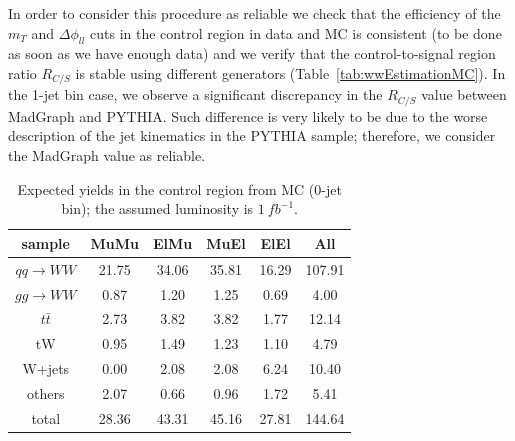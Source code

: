 In order to consider this procedure as reliable we check that the efficiency of the $m_T$ and $\Delta\phi_{ll}$ 
cuts in the control region in data and MC is consistent (to be done as soon as we have enough data) and we verify that the control-to-signal 
region ratio $R_{C/S}$ is stable using different generators (Table~\ref{tab:wwEstimationMC}). 
In the 1-jet bin case, we observe a significant discrepancy in the $R_{C/S}$ value between MadGraph and PYTHIA.
Such difference is very likely to be due to the worse description of the jet kinematics in the PYTHIA sample;
therefore, we consider the MadGraph value as reliable.

\begin{table}[!htbp]
\begin{center}
\begin{tabular}{|c|c|c|c|c|c|} \hline
 sample               &       MuMu &       ElMu &       MuEl &       ElEl &        All \\ \hline\hline
   $qq\rightarrow WW$ &      21.75 &      34.06 &      35.81 &      16.29 &     107.91 \\ 
   $gg\rightarrow WW$ &       0.87 &       1.20 &       1.25 &       0.69 &       4.00 \\ 
  $t\bar t$           &       2.73 &       3.82 &       3.82 &       1.77 &      12.14 \\ 
     tW               &       0.95 &       1.49 &       1.23 &       1.10 &       4.79 \\ 
 W+jets               &       0.00 &       2.08 &       2.08 &       6.24 &      10.40 \\ 
 others               &       2.07 &       0.66 &       0.96 &       1.72 &       5.41 \\ \hline
  total               &      28.36 &      43.31 &      45.16 &      27.81 &     144.64 \\ \hline
\end{tabular}
\caption{Expected yields in the control region from MC (0-jet bin); the assumed luminosity is $1~fb^{-1}$.}
\label{tab:wwEstimationSByields}
\end{center}
\end{table}

